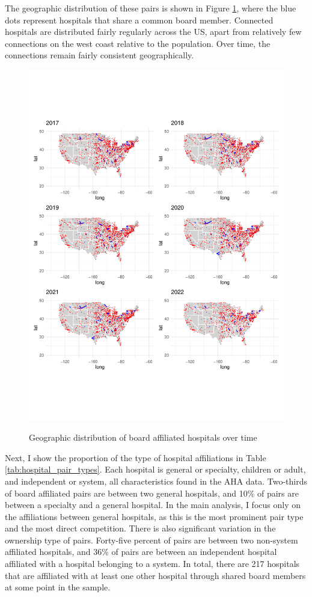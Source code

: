 \documentclass[12pt]{article}
\begin{document}
    The geographic distribution of these pairs is shown in Figure \ref{fig:connected_maps}, where the blue dots represent hospitals that share a common board member. Connected hospitals are distributed fairly regularly across the US, apart from relatively few connections on the west coast relative to the population. Over time, the connections remain fairly consistent geographically.

    \begin{figure}[ht!]
        \centering
        \caption{Geographic distribution of board affiliated hospitals over time}
        \includegraphics[width=.8\textwidth]{Objects/connected_maps.pdf}
        \label{fig:connected_maps}
    \end{figure}



    Next, I show the proportion of the type of hospital affiliations in Table \ref{tab:hospital_pair_types}. Each hospital is general or specialty, children or adult, and independent or system, all characteristics found in the AHA data. Two-thirds of board affiliated pairs are between two general hospitals, and 10\% of pairs are between a specialty and a general hospital. In the main analysis, I focus only on the affiliations between general hospitals, as this is the most prominent pair type and the most direct competition. 
    There is also significant variation in the ownership type of pairs. Forty-five percent of pairs are between two non-system affiliated hospitals, and 36\% of pairs are between an independent hospital affiliated with a hospital belonging to a system. In total, there are 217 hospitals that are affiliated with at least one other hospital through shared board members at some point in the sample. 
\end{document}
